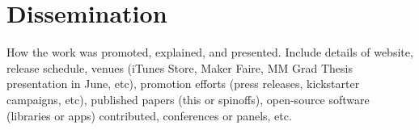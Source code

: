 \chapter{Dissemination}
How the work was promoted, explained, and presented. Include details of website, release schedule, venues (iTunes Store, Maker Faire, MM Grad Thesis presentation in June, etc), promotion efforts (press releases, kickstarter campaigns, etc), published papers (this or spinoffs), open-source software (libraries or apps) contributed, conferences or panels, etc.